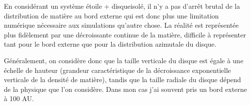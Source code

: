 \bigskip

En considérant un système \og étoile + disque\fg isolé, il n'y a pas d'arrêt brutal de la distribution de matière au bord externe qui est donc plus une limitation numérique nécessaire aux simulations qu'autre chose. La réalité est représentée plus fidèlement par une décroissante continue de la matière, difficile à représenter tant pour le bord externe que pour la distribution azimutale du disque. 

Généralement, on considère donc que la taille verticale du disque est égale à une échelle de hauteur (grandeur caractéristique de la décroissance exponentielle verticale de la densité de matière), tandis que la taille radiale du disque dépend de la physique que l'on considère. Dans mon cas j'ai souvent pris un bord externe à 100 AU.

